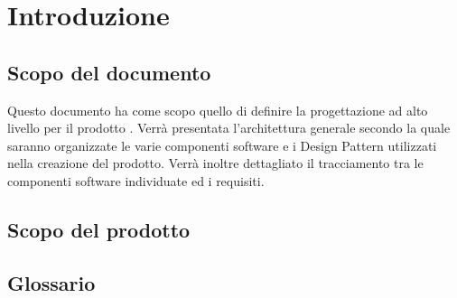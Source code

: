%


\section{Introduzione} %
\label{sec:introduzione}

	\subsection{Scopo del documento} %
	\label{sub:scopo_del_documento}
	Questo documento ha come scopo quello di definire la progettazione ad alto livello per il prodotto \projectName. Verrà presentata l’architettura generale secondo la quale saranno organizzate le varie componenti software e i Design Pattern utilizzati nella creazione del prodotto. Verrà inoltre dettagliato il tracciamento tra le componenti software individuate ed i requisiti.

	\subsection{Scopo del prodotto} %
	\label{sub:scopo_del_prodotto}
	\productScope

	\subsection{Glossario} %
	\label{sub:glossario}
	\glossarioDesc

